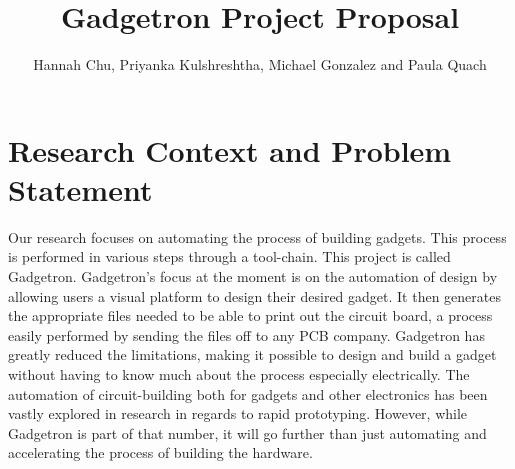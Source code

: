 \documentclass[12pt]{article}
\begin{document}
\author{Hannah Chu, Priyanka Kulshreshtha, Michael Gonzalez and Paula Quach}
\title{Gadgetron Project Proposal}
\maketitle

\section{Research Context and Problem Statement}
    Our research focuses on automating the process of building gadgets. This process is performed in various steps through a tool-chain. This project is called Gadgetron. Gadgetron's focus at the moment is on the automation of design by allowing users a visual platform to design their desired gadget. It then generates the appropriate files needed to be able to print out the circuit board, a process easily performed by sending the files off to any PCB company. Gadgetron has greatly reduced the limitations, making it possible to design and build a gadget without having to know much about
	the process especially electrically. The automation of circuit-building both for gadgets and other electronics has been vastly explored in research in regards to rapid prototyping. However, while Gadgetron is part of that number, it will go further than just automating and accelerating the process of building the hardware.
\end{document}
